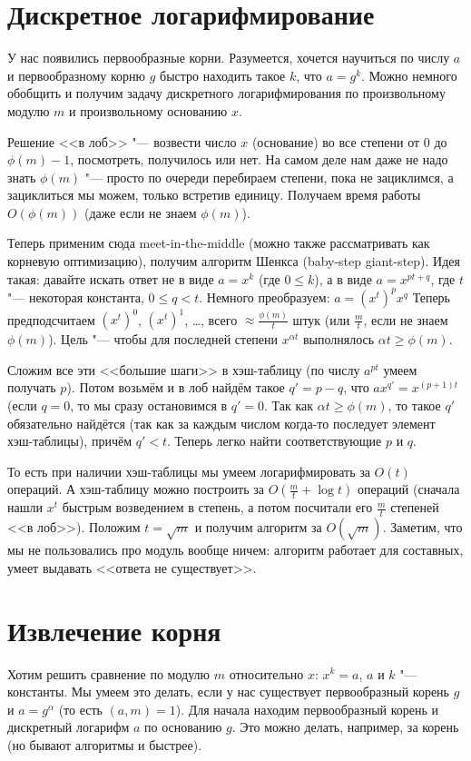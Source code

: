\section{Дискретное логарифмирование}
У нас появились первообразные корни.
Разумеется, хочется научиться по числу $a$ и первообразному корню $g$ быстро находить такое $k$, что $a=g^k$.
Можно немного обобщить и получим задачу дискретного логарифмирования по произвольному модулю $m$ и произвольному основанию $x$.

Решение <<в лоб>> "--- возвести число $x$ (основание) во все степени от $0$ до $\phi(m)-1$, посмотреть, получилось или нет.
На самом деле нам даже не надо знать $\phi(m)$ "--- просто по очереди перебираем степени, пока не зациклимся, а зациклиться мы можем, только встретив единицу.
Получаем время работы $O(\phi(m))$ (даже если не знаем $\phi(m)$).

Теперь применим сюда meet-in-the-middle (можно также рассматривать как корневую оптимизацию), получим алгоритм Шенкса (baby-step giant-step).
Идея такая: давайте искать ответ не в виде $a=x^k$ (где $0 \le k$), а в виде $a=x^{pt+q}$, где $t$ "--- некоторая константа, $0 \le q < t$.
Немного преобразуем: $a=(x^t)^px^q$
Теперь предподсчитаем $(x^t)^0$, $(x^t)^1$, \dots, всего $\approx \frac{\phi(m)}{t}$ штук (или $\frac{m}{t}$, если не знаем $\phi(m)$).
Цель "--- чтобы для последней степени $x^{\alpha t}$ выполнялось $\alpha t \ge \phi(m)$.
\begin{center}

\end{center}
Сложим все эти <<большие шаги>> в хэш-таблицу (по числу $a^{pt}$ умеем получать $p$).
Потом возьмём и в лоб найдём такое $q'=p-q$, что $ax^{q'} = x^{(p+1)t}$ (если $q=0$, то мы сразу остановимся в $q'=0$.
Так как $\alpha t \ge \phi(m)$, то такое $q'$ обязательно найдётся (так как за каждым числом когда-то последует элемент хэш-таблицы), причём $q'<t$.
Теперь легко найти соответствующие $p$ и $q$.

То есть при наличии хэш-таблицы мы умеем логарифмировать за $O(t)$ операций.
А хэш-таблицу можно построить за $O(\frac{m}{t} + \log t)$ операций (сначала нашли $x^t$ быстрым возведением в степень, а потом посчитали его $\frac mt$ степеней <<в лоб>>).
Положим $t=\sqrt m$ и получим алгоритм за $O(\sqrt m)$.
Заметим, что мы не пользовались про модуль вообще ничем: алгоритм работает для составных, умеет выдавать <<ответа не существует>>.

\section{Извлечение корня}
Хотим решить сравнение по модулю $m$ относительно $x$: $x^k=a$, $a$ и $k$ "--- константы.
Мы умеем это делать, если у нас существует первообразный корень $g$ и $a=g^{\alpha}$
(то есть $(a, m)=1$).
Для начала находим первообразный корень и дискретный логарифм $a$ по основанию $g$.
Это можно делать, например, за корень (но бывают алгоритмы и быстрее).

